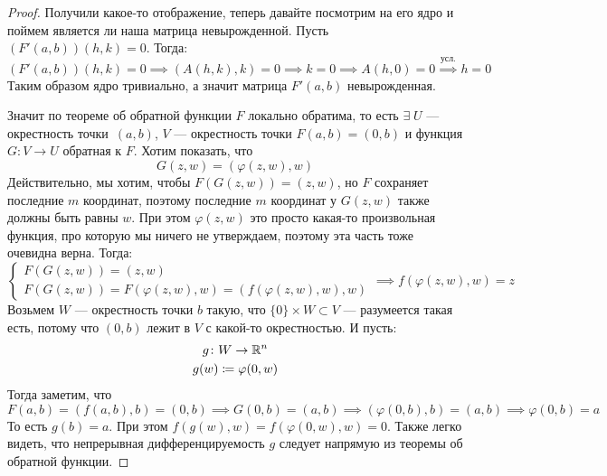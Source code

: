 \begin{proof}
    Получили какое-то отображение, теперь давайте посмотрим на его ядро и поймем является ли наша матрица невырожденной. Пусть $(F'(a, b))(h, k) = 0$. Тогда:
    \begin{equation*}
      (F'(a, b))(h, k) = 0 \implies (A(h, k), k) = 0 \implies k = 0 \implies A(h, 0) = 0 \overset{\text{усл.}}{\implies} h = 0
    \end{equation*}
    Таким образом ядро тривиально, а значит матрица $F'(a, b)$ невырожденная.
  
    Значит по теореме об обратной функции $F$ локально обратима, то есть $\exists\; U$ --- окрестность точки~$(a, b)$, $V$ --- окрестность точки $F(a, b) = (0, b)$ и функция $G\colon V \to U$ обратная к $F$. Хотим показать, что
    \begin{equation*}
      G(z, w) = (\varphi(z, w), w)
    \end{equation*}
    Действительно, мы хотим, чтобы $F(G(z, w)) = (z, w)$, но $F$ сохраняет последние $m$ координат, поэтому последние $m$ координат у $G(z, w)$ также должны быть равны $w$. При этом $\varphi(z, w)$ это просто какая-то произвольная функция, про которую мы ничего не утверждаем, поэтому эта часть тоже очевидна верна. Тогда:
    \begin{equation*}
      \begin{cases}
        F(G(z, w)) = (z ,w) \\
        F(G(z, w)) = F(\varphi(z, w), w) = (f(\varphi(z, w), w), w)
      \end{cases}
      \implies f(\varphi(z, w), w) = z
    \end{equation*}
    Возьмем $W$ --- окрестность точки $b$ такую, что $\{0\} \times W \subset V$ --- разумеется такая есть, потому что $(0, b)$ лежит в $V$ с какой-то окрестностью. И пусть:
    \begin{equation*}
      \begin{gathered}
        g\colon W \to \mathbb{R}^n \\
        g(w) \coloneqq \varphi(0, w)
      \end{gathered}
    \end{equation*}
    Тогда заметим, что 
    \begin{equation*}
      F(a, b) = (f(a, b), b) = (0, b) \implies G(0, b) = (a, b) \implies (\varphi(0, b), b) = (a, b) \implies \varphi(0, b) = a
    \end{equation*}
    То есть $g(b) = a$. При этом $f(g(w), w) = f(\varphi(0, w), w) = 0$. Также легко видеть, что непрерывная дифференцируемость $g$ следует напрямую из теоремы об обратной функции. 
  

\end{proof}
